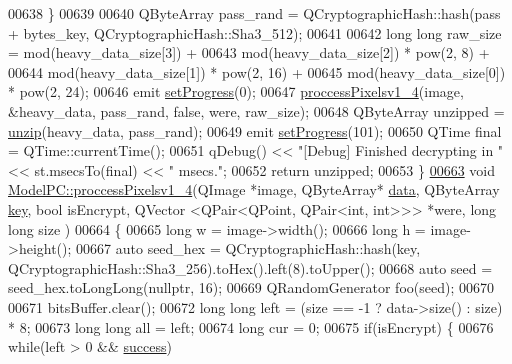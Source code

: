 \begin{DoxyCode}
00638     \}
00639 
00640     QByteArray pass\_rand = QCryptographicHash::hash(pass + bytes\_key, QCryptographicHash::Sha3\_512);
00641 
00642     \textcolor{keywordtype}{long} \textcolor{keywordtype}{long} raw\_size = mod(heavy\_data\_size[3]) +
00643             mod(heavy\_data\_size[2]) * pow(2, 8) +
00644             mod(heavy\_data\_size[1]) * pow(2, 16) +
00645             mod(heavy\_data\_size[0]) * pow(2, 24);
00646     emit \hyperlink{class_model_p_c_afdcd80f0ed5062e145a71f09b0897547}{setProgress}(0);
00647     \hyperlink{class_model_p_c_a5cdb4d1d61ff62ee9d45b496a7dbf1fb}{proccessPixelsv1\_4}(image, &heavy\_data, pass\_rand, \textcolor{keyword}{false}, were, raw\_size);
00648     QByteArray unzipped = \hyperlink{class_model_p_c_a6da88f166785a49f73b22c169f956fd0}{unzip}(heavy\_data, pass\_rand);
00649     emit \hyperlink{class_model_p_c_afdcd80f0ed5062e145a71f09b0897547}{setProgress}(101);
00650     QTime \textcolor{keyword}{final} = QTime::currentTime();
00651     qDebug() << \textcolor{stringliteral}{"[Debug] Finished decrypting in "} << st.msecsTo(\textcolor{keyword}{final}) << \textcolor{stringliteral}{" msecs."};
00652     \textcolor{keywordflow}{return} unzipped;
00653 \}
\hypertarget{modelpc_8cpp_source.tex_l00663}{}\hyperlink{class_model_p_c_a5cdb4d1d61ff62ee9d45b496a7dbf1fb}{00663} \textcolor{keywordtype}{void} \hyperlink{class_model_p_c_a5cdb4d1d61ff62ee9d45b496a7dbf1fb}{ModelPC::proccessPixelsv1\_4}(QImage *image, QByteArray* 
      \hyperlink{namespace_errors_dict_setup_af570460846fb9f0c91abd308a095dcdc}{data}, QByteArray \hyperlink{namespace_errors_dict_setup_a09c268098d09ffb8e5504f30fa6d5dd9}{key}, \textcolor{keywordtype}{bool} isEncrypt, QVector <QPair<QPoint, QPair<int, int>>> *were, \textcolor{keywordtype}{long} \textcolor{keywordtype}{long} size
      )
00664 \{
00665     \textcolor{keywordtype}{long} w = image->width();
00666     \textcolor{keywordtype}{long} h = image->height();
00667     \textcolor{keyword}{auto} seed\_hex = QCryptographicHash::hash(key, QCryptographicHash::Sha3\_256).toHex().left(8).toUpper();
00668     \textcolor{keyword}{auto} seed = seed\_hex.toLongLong(\textcolor{keyword}{nullptr}, 16);
00669     QRandomGenerator foo(seed);
00670 
00671     bitsBuffer.clear();
00672     \textcolor{keywordtype}{long} \textcolor{keywordtype}{long} left = (size == -1 ? data->size() : size) * 8;
00673     \textcolor{keywordtype}{long} \textcolor{keywordtype}{long} all = left;
00674     \textcolor{keywordtype}{long} cur = 0;
00675     \textcolor{keywordflow}{if}(isEncrypt) \{
00676         \textcolor{keywordflow}{while}(left > 0 && \hyperlink{class_model_p_c_a945ffbbc44a832b953c191debd448f4c}{success})

\end{DoxyCode}
